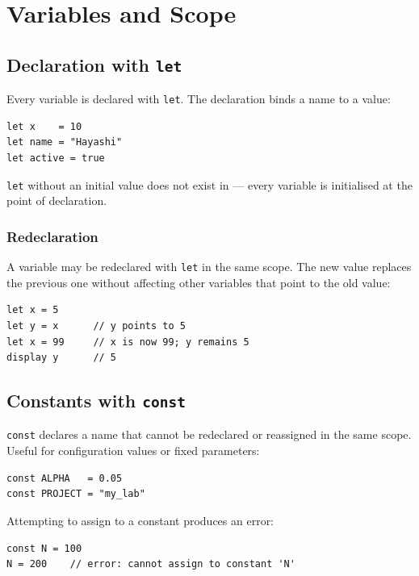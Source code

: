\chapter{Variables and Scope}

\section{Declaration with \texttt{let}}

Every variable is declared with \lstinline{let}. The declaration binds a
name to a value:

\begin{lstlisting}
let x    = 10
let name = "Hayashi"
let active = true
\end{lstlisting}

\lstinline{let} without an initial value does not exist in \hayashi{} —
every variable is initialised at the point of declaration.

\subsection*{Redeclaration}

A variable may be redeclared with \lstinline{let} in the same scope. The
new value replaces the previous one without affecting other variables that
point to the old value:

\begin{lstlisting}
let x = 5
let y = x      // y points to 5
let x = 99     // x is now 99; y remains 5
display y      // 5
\end{lstlisting}

\section{Constants with \texttt{const}}

\lstinline{const} declares a name that cannot be redeclared or reassigned
in the same scope. Useful for configuration values or fixed parameters:

\begin{lstlisting}
const ALPHA   = 0.05
const PROJECT = "my_lab"
\end{lstlisting}

Attempting to assign to a constant produces an error:

\begin{lstlisting}
const N = 100
N = 200    // error: cannot assign to constant 'N'
\end{lstlisting}

